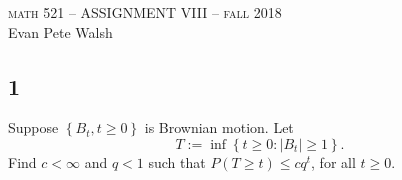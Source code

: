 \documentclass[12pt]{article}
\begin{document}
\thispagestyle{empty}
\begin{center}
  \Large \textsc{math 521 -- ASSIGNMENT VIII -- fall 2018} \\ 
  \vspace{5mm}
  \large Evan Pete Walsh
\end{center}


\subsection*{1}
\begin{tcolorbox}
  Suppose $ \left\{ B_t, t \geq 0 \right\} $ is Brownian motion. Let
  \[
    T := \inf \left\{ t \geq 0 : |B_t| \geq 1 \right\}.
  \]
  Find $c  < \infty$ and $q < 1$ such that $P(T \geq t) \leq cq^t$, for all $t \geq 0$.
\end{tcolorbox}
\end{document}
